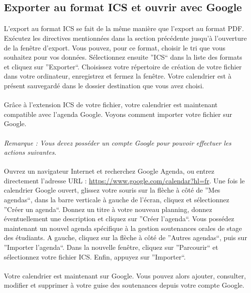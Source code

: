 \documentclass[a4paper,10pt]{book}
\begin{document}
      \subsection{Exporter au format ICS et ouvrir avec Google}
	  
	\paragraph{}
	  L'export au format ICS se fait de la même manière que l'export au format PDF.
	  Exécutez les directives mentionnées dans la section précédente jusqu'à l'ouverture de la fenêtre d'export.
	  Vous pouvez, pour ce format, choisir le tri que vous souhaitez pour vos données.
	  Sélectionnez ensuite ''ICS`` dans la liste des formats et cliquez sur ''Exporter``.
	  Choisissez votre répertoire de création de votre fichier dans votre ordinateur, enregistrez  et fermez la fenêtre.
	  Votre calendrier est à présent sauvegardé dans le dossier destination que vous avez choisi.
	  
	\paragraph{}
	  Grâce à l'extension ICS de votre fichier, votre calendrier est maintenant compatible avec l'agenda Google.
	  Voyons comment importer votre fichier sur Google.
	  
	  
	\paragraph{}
	  \textit{Remarque : Vous devez posséder un compte Google pour pouvoir effectuer les actions suivantes.}
	
	\paragraph{}
	  Ouvrez un navigateur Internet et recherchez Google Agenda, ou entrez directement l'adresse URL : \url{https://www.google.com/calendar?hl=fr}.
	  Une fois le calendrier Google ouvert, glissez votre souris sur la flèche à côté de ''Mes agendas``, dans la barre verticale à gauche de l'écran, cliquez et sélectionnez ''Créer un agenda``.
	  Donnez un titre à votre nouveau planning, donnez éventuellement une description et cliquez sur ''Créer l'agenda``.
	  Vous possédez maintenant un nouvel agenda spécifique à la gestion soutenances orales de stage des étudiants.
	  A gauche, cliquez sur la flèche à côté de ''Autres agendas``, puis sur ''Importer l'agenda``.
	  Dans la nouvelle fenêtre, cliquez sur ''Parcourir`` et sélectionnez votre fichier ICS.
	  Enfin, appuyez sur ''Importer``.
	  
	\paragraph{}
	  Votre calendrier est maintenant sur Google.
	  Vous pouvez alors ajouter, consulter, modifier et supprimer à votre guise des soutenances depuis votre compte Google.
	  
	     

    
\end{document}
